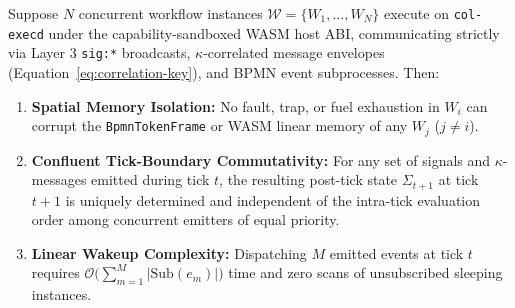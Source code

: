 \begin{theorem}
\label{thm:mediated-choreography}
Suppose $N$ concurrent workflow instances $\mathcal{W} = \{W_1, \dots, W_N\}$ execute on
\texttt{col-execd} under the capability-sandboxed WASM host ABI, communicating strictly via Layer 3
\texttt{sig:*} broadcasts, $\kappa$-correlated message envelopes (Equation~\ref{eq:correlation-key}), and
BPMN event subprocesses. Then:
\begin{enumerate}
    \item \textbf{Spatial Memory Isolation:} No fault, trap, or fuel exhaustion in $W_i$ can corrupt the
        \texttt{BpmnTokenFrame} or WASM linear memory of any $W_j$ ($j \neq i$).
    \item \textbf{Confluent Tick-Boundary Commutativity:} For any set of signals and $\kappa$-messages
        emitted during tick $t$, the resulting post-tick state $\Sigma_{t+1}$ at tick $t+1$ is uniquely
        determined and independent of the intra-tick evaluation order among concurrent emitters of equal
        priority.
    \item \textbf{Linear Wakeup Complexity:} Dispatching $M$ emitted events at tick $t$ requires
        $\mathcal{O}\bigl(\sum_{m=1}^M |\mathrm{Sub}(e_m)|\bigr)$ time and zero scans of unsubscribed
        sleeping instances.
\end{enumerate}
\end{theorem}

